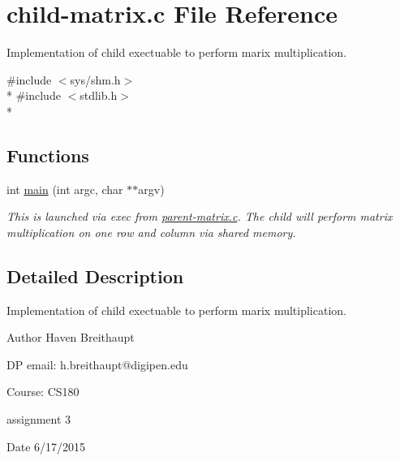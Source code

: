 \hypertarget{child-matrix_8c}{\section{child-\/matrix.c File Reference}
\label{child-matrix_8c}
}


Implementation of child exectuable to perform marix multiplication.  


{\ttfamily \#include $<$sys/shm.\-h$>$}\\*
{\ttfamily \#include $<$stdlib.\-h$>$}\\*
\subsection*{Functions}
\begin{DoxyCompactItemize}
\item 
int \hyperlink{child-matrix_8c_a3c04138a5bfe5d72780bb7e82a18e627}{main} (int argc, char $\ast$$\ast$argv)
\begin{DoxyCompactList}\small\item\em This is launched via exec from \hyperlink{parent-matrix_8c}{parent-\/matrix.\-c}. The child will perform matrix multiplication on one row and column via shared memory. \end{DoxyCompactList}\end{DoxyCompactItemize}


\subsection{Detailed Description}
Implementation of child exectuable to perform marix multiplication. \begin{DoxyAuthor}{Author}
Haven Breithaupt 
\end{DoxyAuthor}
\begin{DoxyParagraph}{D\-P email\-: h.breithaupt@digipen.edu}

\end{DoxyParagraph}
\begin{DoxyParagraph}{Course\-: C\-S180}

\end{DoxyParagraph}
\begin{DoxyParagraph}{assignment 3}

\end{DoxyParagraph}
\begin{DoxyDate}{Date}
6/17/2015 
\end{DoxyDate}


